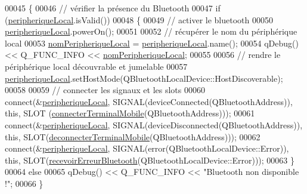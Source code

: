 \begin{DoxyCode}
00045 \{
00046     \textcolor{comment}{// vérifier la présence du Bluetooth}
00047     \textcolor{keywordflow}{if} (\hyperlink{class_communication_a2d643d199169dfe1d258df54d3ee5728}{peripheriqueLocal}.isValid())
00048     \{
00049         \textcolor{comment}{// activer le bluetooth}
00050         \hyperlink{class_communication_a2d643d199169dfe1d258df54d3ee5728}{peripheriqueLocal}.powerOn();
00051 
00052         \textcolor{comment}{// récupérer le nom du périphérique local}
00053         \hyperlink{class_communication_acfe0b2b569ebf174fcdd766272b89ba8}{nomPeripheriqueLocal} = \hyperlink{class_communication_a2d643d199169dfe1d258df54d3ee5728}{peripheriqueLocal}.name();
00054         qDebug() << Q\_FUNC\_INFO << \hyperlink{class_communication_acfe0b2b569ebf174fcdd766272b89ba8}{nomPeripheriqueLocal};
00055 
00056         \textcolor{comment}{// rendre le périphérique local découvrable et jumelable}
00057         \hyperlink{class_communication_a2d643d199169dfe1d258df54d3ee5728}{peripheriqueLocal}.setHostMode(QBluetoothLocalDevice::HostDiscoverable);
00058 
00059         \textcolor{comment}{// connecter les signaux et les slots}
00060         connect(&\hyperlink{class_communication_a2d643d199169dfe1d258df54d3ee5728}{peripheriqueLocal}, SIGNAL(deviceConnected(QBluetoothAddress)), \textcolor{keyword}{this}, SLOT
      (\hyperlink{class_communication_a9640339b93f4a99f80426b7345615037}{connecterTerminalMobile}(QBluetoothAddress)));
00061         connect(&\hyperlink{class_communication_a2d643d199169dfe1d258df54d3ee5728}{peripheriqueLocal}, SIGNAL(deviceDisconnected(QBluetoothAddress)), \textcolor{keyword}{this}, 
      SLOT(\hyperlink{class_communication_aeeb47bc3c4d7419fefb737168638442e}{deconnecterTerminalMobile}(QBluetoothAddress)));
00062         connect(&\hyperlink{class_communication_a2d643d199169dfe1d258df54d3ee5728}{peripheriqueLocal}, SIGNAL(error(QBluetoothLocalDevice::Error)), \textcolor{keyword}{this}, 
      SLOT(\hyperlink{class_communication_adbbab5630096d6374c4d7e52508b8a37}{recevoirErreurBluetooth}(QBluetoothLocalDevice::Error)));
00063     \}
00064     \textcolor{keywordflow}{else}
00065         qDebug() << Q\_FUNC\_INFO << \textcolor{stringliteral}{"Bluetooth non disponible !"};
00066 \}
\end{DoxyCode}
\mbox{\label{class_communication_ad99afe857470e6e95432b3adcb97fea2}} 
